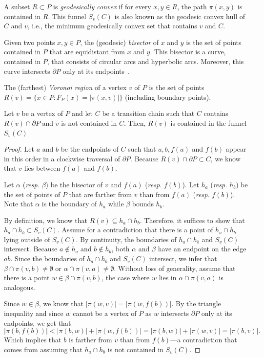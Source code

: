 \documentclass[a4paper,UKenglish]{lipics}
\newcommand{\F}[2]{\ensuremath{F_{\scriptscriptstyle #1}(#2)}}
\newcommand{\fn}[2]{\ensuremath{S_{\scriptscriptstyle #1}(#2)}}
\newcommand{\ff}[1]{\ensuremath{f(#1)}}
\newcommand{\g}[2]{\ensuremath{|\pi(#1, #2)|}}
\newcommand{\p}[2]{\ensuremath{\pi(#1, #2)}}
\begin{document}
A subset $R\subset P$ is \emph{geodesically convex} if for every $x,y\in R$, the path $\p{x}{y}$ is contained in $R$.
This funnel $\fn{v}{C}$ is also known as the geodesic convex hull of $C$ and $v$, i.e., the minimum geodesically convex set that contains $v$ and $C$.

Given two points $x,y\in P$, the (geodesic) \emph{bisector} of $x$ and $y$ is the set of points contained in $P$ that are equidistant from $x$ and $y$. This bisector is a curve, contained in $P$, that consists of circular arcs and hyperbolic arcs. Moreover, this curve intersects $\partial P$ only at its endpoints~\cite[Lemma 3.22]{aronov1989geodesic}.

The (farthest) \emph{Voronoi region} of a vertex $v$ of $P$ is the set of points $R(v) = \{x\in P : \F{P}{x} = \g{x}{v}\}$ (including boundary points).

\begin{lemma}\label{lemma:Funnel contains Voronoi region}
Let $v$ be a vertex of $P$ and let $C$ be a transition chain such that $C$ contains $R(v)\cap \partial P$ and $v$ is not contained in $C$.
Then, $R(v)$ is contained in the funnel $\fn{v}{C}$
\end{lemma}
\begin{proof}
Let $a$ and $b$ be the endpoints of $C$ such that $a,b, \ff{a}$ and $\ff{b}$ appear in this order in a clockwise traversal of $\partial P$.
Because $R(v)\cap \partial P\subset C$, we know that $v$ lies between $\ff{a}$ and $\ff{b}$.

Let $\alpha$ (\emph{resp.} $\beta$) be the bisector of $v$ and $\ff{a}$ (\emph{resp.} $\ff{b}$).
Let $h_a$ (\emph{resp.} $h_b$) be the set of points of $P$ that are farther from $v$ than from $\ff{a}$ (\emph{resp.} $\ff{b}$).
Note that $\alpha$ is the boundary of $h_a$ while $\beta$ bounds $h_b$.

By definition, we know that $R(v)\subseteq h_a\cap h_b$. Therefore, it suffices to show that $h_a\cap h_b\subset \fn{v}{C}$.
Assume for a contradiction that there is a point of $h_a\cap h_b$ lying outside of $\fn{v}{C}$. 
By continuity, the boundaries of $h_a\cap h_b$ and $\fn{v}{C}$ intersect.
Because $a\notin h_a$ and $b\notin h_b$, both $\alpha$ and $\beta$ have an endpoint on the edge $ab$.
Since the boundaries of $h_a\cap h_b$ and $\fn{v}{C}$ intersect, we infer that $\beta \cap \p{v}{b}\neq \emptyset$ or $\alpha \cap \p{v}{a}\neq \emptyset$.
Without loss of generality, assume that there is a point $w\in \beta \cap \p{v}{b}$, the case where $w$ lies in $\alpha \cap \p{v}{a}$ is analogous. 

Since $w\in \beta$, we know that $\g{w}{v} = \g{w}{ \ff{b}}$. By the triangle inequality and since $w$ cannot be a vertex of $P$ as $w$ intersects $\partial P$ only at its endpoints, we get that
$$\g{b}{\ff{b}} < \g{b}{w} + \g{w}{\ff{b}} = \g{b}{w} + \g{w}{v} = \g{b}{v}.$$
Which implies that $b$ is farther from $v$ than from $\ff{b}$---a contradiction that comes from assuming that $h_a\cap h_b$ is not contained in $\fn{v}{C}$.
\end{proof}
\end{document}
